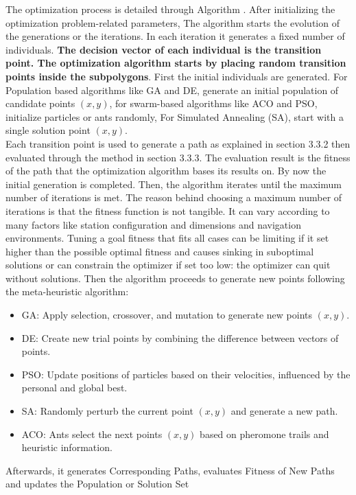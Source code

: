 The optimization process is detailed through Algorithm . After initializing the optimization problem-related
parameters, The algorithm starts the evolution of the generations or the iterations. In each iteration it generates a fixed 
number of individuals. \textbf{The decision vector of each individual is the transition point. The optimization algorithm
starts by placing random transition points inside the subpolygons}. First the initial individuals are generated. 
For Population based algorithms like GA and DE, generate an initial population of candidate points $(x, y)$, for swarm-based algorithms
like ACO and PSO, 
initialize particles or ants randomly, For Simulated Annealing (SA), start with a single solution point $(x, y)$.\\
Each transition point is used to generate a path as explained
in section 3.3.2 then evaluated through the method in section 3.3.3. The evaluation result is the fitness of the path that the 
optimization algorithm bases its results on. By now the initial generation is completed. Then, the algorithm iterates until 
the maximum number of iterations is met. The reason behind choosing a maximum number of iterations is that the fitness function 
is not tangible. It can vary according to many factors like station configuration and dimensions and navigation environments.
Tuning a goal fitness that fits all cases can be limiting if it set higher than the possible optimal fitness and causes sinking in 
suboptimal solutions or can constrain the optimizer if set too low: the optimizer can quit without solutions.
Then the algorithm proceeds to generate new points following the meta-heuristic algorithm:
\begin{itemize}
    \item GA: Apply selection, crossover, and mutation to generate new points $(x, y)$.
    \item DE: Create new trial points by combining the difference between vectors of points.
    \item PSO: Update positions of particles based on their velocities, influenced by the personal and global best.
    \item SA: Randomly perturb the current point $(x, y)$ and generate a new path.
    \item ACO: Ants select the next points $(x, y)$ based on pheromone trails and heuristic information.
\end{itemize}
Afterwards, it generates Corresponding Paths, evaluates Fitness of New Paths and updates the Population or Solution Set
